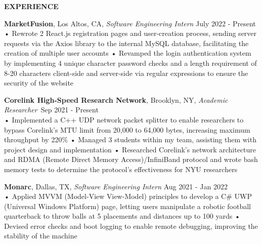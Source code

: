 \documentclass{resume} %
\begin{document}
\begin{rSection}{\textbf{EXPERIENCE}}

\textbf{MarketFusion}, Los Altos, CA, {\emph{Software Engineering Intern}} \hfill July 2022 - Present\\
• Rewrote 2 React.js registration pages and user-creation process, sending server requests via the Axios library to the internal MySQL database, facilitating the creation of multiple user accounts \newline
• Revamped the login authentication system by implementing 4 unique character password checks and a length requirement of 8-20 characters client-side and server-side via regular expressions to ensure the security of the website 

\textbf{Corelink High-Speed Research Network}, Brooklyn, NY, {\emph{Academic Researcher}}\ \hfill Sep 2021 - Present \\
• Implemented a C++ UDP network packet splitter to enable researchers to bypass Corelink's MTU limit from 20,000 to 64,000 bytes, increasing maximum throughput by 220\% \newline
• Managed 3 students within my team, assisting them with project design and implementation \newline
• Researched Corelink’s network architecture and RDMA (Remote Direct Memory Access)/InfiniBand protocol and wrote bash memory tests to determine the protocol's effectiveness for NYU researchers

\textbf{Monarc}, Dallas, TX, {\emph{Software Engineering Intern}} \hfill Aug 2021 - Jan 2022\\
• Applied MVVM (Model-View View-Model) principles to develop a C\# UWP (Universal Windows Platform) page, letting users manipulate a robotic football quarterback to throw balls at 5 placements and distances up to 100 yards \newline  %
• Devised error checks and boot logging to enable remote debugging, improving the stability of the machine \smallskip
\end{rSection} 
\end{document}
